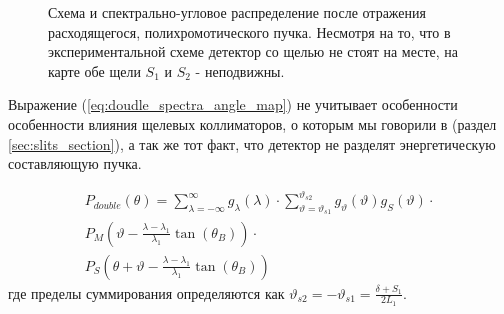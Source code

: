 \begin{figure}[H]
  \centering
  \hfill

  \caption{Схема и спектрально-угловое распределение после отражения расходящегося, полихромотического пучка. Несмотря на то, что в
  экспериментальной схеме детектор со щелью не стоят на месте, на карте обе щели $S_1$ и $S_2$ - неподвижны. }
  \label{ris:double_crystal_schem_lamtet}
\end{figure}

Выражение (\ref{eq:doudle_spectra_angle_map}) не учитывает особенности особенности влияния щелевых коллиматоров, о которым мы говорили в
(раздел \ref{sec:slits_section}), а так же тот факт, что детектор не разделят энергетическую составляющую пучка.


\begin{eqnarray} \label{eq:doudle_spectra_angle_map}
  P_{double}(\theta) = \sum_{\lambda = -\infty}^{\infty}g_{\lambda}(\lambda)\cdot
  \sum_{\vartheta = \vartheta_{s1}}^{\vartheta_{s2}} g_{\vartheta}(\vartheta) g_{S}(\vartheta) \cdot \nonumber \\
   P_M \left(\vartheta - \frac{\lambda - \lambda_1}{\lambda_1}\tan(\theta_B) \right) \cdot \nonumber \\
   P_S \left(\theta + \vartheta - \frac{\lambda - \lambda_1}{\lambda_1}\tan(\theta_B)\right)
 \end{eqnarray}
 где пределы суммирования определяются как $\vartheta_{s2} = - \vartheta_{s1} = \frac{\delta+S_1}{2L_1}$.

